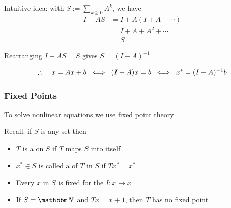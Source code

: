\begin{frame}
    
    Intuitive idea: with $S := \sum_{k \geq 0} A^k$, we have
    \begin{align*}
        I + AS 
        & = I + A (I + A + \cdots)
        \\
        & = I + A + A^2 + \cdots 
        \\
        & = S
    \end{align*}

    Rearranging $I + AS = S$ gives $S = (I - A)^{-1}$
            \vspace{0.5em}
            \vspace{0.5em}

    \begin{equation*}
        \therefore \quad
        x = Ax + b
        \; \iff \; 
        (I - A)x = b
        \; \iff \; 
        x^* = (I-A)^{-1} b
    \end{equation*}


\end{frame}


\begin{frame}
    \frametitle{Fixed Points}    

    To solve \underline{nonlinear} equations we use fixed point theory

            \vspace{0.4em}
            \vspace{0.4em}
    Recall: if $S$ is any set then
    \begin{itemize}
        \item $T$ is a  on $S$ if $T$ maps $S$ into itself
            \vspace{0.4em}
        \item  $x^* \in S$ is called a
             of $T$ in $S$ if $T x^* = x^*$  
    \end{itemize}

            \vspace{0.4em}
            \vspace{0.4em}
    \Egs 
    \begin{itemize}
        \item Every $x$ in $S$ is fixed for the 
            $I \colon x \mapsto x$
            \vspace{0.4em}
        \item If $S = \NN$ and $Tx = x+1$, then $T$ has no fixed point
    \end{itemize}


\end{frame}


